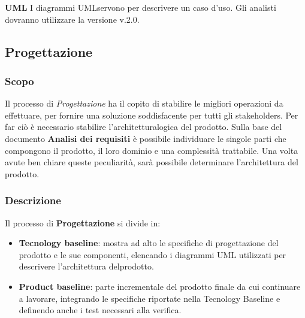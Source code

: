 				\textbf{UML} \newline \newline
				I diagrammi UML\glo servono per descrivere un caso d'uso. Gli analisti dovranno utilizzare la versione v.2.0. \newline \newline
	\subsection{Progettazione}
		\subsubsection{Scopo}
		Il processo di \textit{Progettazione} ha il copito di stabilire le migliori operazioni da effettuare, per fornire una soluzione soddisfacente per tutti gli stakeholders\glo. Per far ciò è necessario stabilire l'architettura\glo logica del prodotto. Sulla base del documento \textbf{Analisi dei requisiti} è possibile individuare le singole parti che compongono il prodotto, il loro dominio e una complessità trattabile. Una volta avute ben chiare queste peculiarità, sarà possibile determinare l'architettura del prodotto.
		\subsubsection{Descrizione}
		Il processo di \textbf{Progettazione} si divide in:
			\begin{itemize}
				\item[] \textbf{Tecnology baseline}: mostra ad alto le specifiche di progettazione del prodotto e le sue componenti, elencando i diagrammi UML utilizzati per descrivere l'architettura delprodotto.
				\item[] \textbf{Product baseline}: parte incrementale del prodotto finale da cui continuare a lavorare, integrando le specifiche riportate nella Tecnology Baseline e  definendo anche i test necessari alla verifica.
			\end{itemize} 
